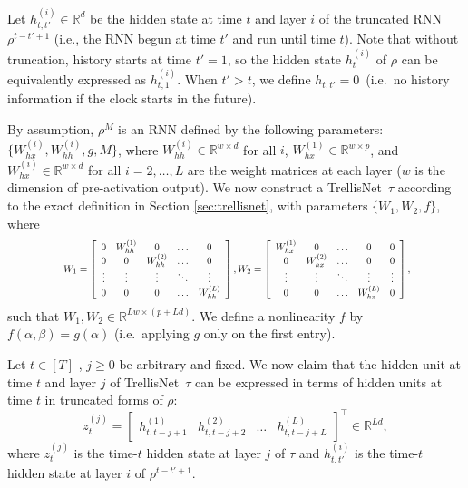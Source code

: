 \documentclass{article} \usepackage{iclr2019_conference,times}
\newcommand{\model}{TrellisNet}
\newenvironment{proofidx}[1]{\renewcommand{\proofname}{Proof of Theorem #1}\proof}{\endproof}
\begin{document}
\vspace{-.1in}
\begin{proofidx}{\ref{thm:trellisnet-rnn}}
Let $h_{t,t'}^{(i)} \in \mathbb{R}^d$ be the hidden state at time $t$ and layer $i$ of the truncated RNN $\rho^{t-t'+1}$ (i.e., the RNN begun at time $t'$ and run until time $t$). Note that without truncation, history starts at time $t'=1$, so the hidden state $h_t^{(i)}$ of $\rho$ can be equivalently expressed as $h_{t,1}^{(i)}$. When $t' > t$, we define \small$h_{t,t'}=0$\normalsize~(i.e.\ no history information if the clock starts in the future).

By assumption, $\rho^M$ is an RNN defined by the following parameters: $\{W_{hx}^{(i)}, W_{hh}^{(i)}, g, M\}$, where $W_{hh}^{(i)} \in \mathbb{R}^{w \times d}$ for all $i$, $W_{hx}^{(1)} \in \mathbb{R}^{w \times p}$, and $W_{hx}^{(i)} \in \mathbb{R}^{w \times d}$ for all $i=2,\dots,L$ are the weight matrices at each layer ($w$ is the dimension of pre-activation output). We now construct a \model~$\tau$ according to the exact definition in Section \ref{sec:trellisnet}, with parameters $\{W_1, W_2, f\}$, where
\begin{equation}
\label{eq:sparse-kernel}
\resizebox{.8\hsize}{!}{
$
W_1 = \left[
\begin{array}{ccccc}
0 & W_{hh}^{(1)} & 0 & \ldots & 0 \\
0 & 0 & W_{hh}^{(2)} & \ldots & 0 \\
\vdots & \vdots & \vdots & \ddots & \vdots \\
0 & 0 & 0 & \ldots & W_{hh}^{(L)}
\end{array}
\right],
W_2 = \left[
\begin{array}{ccccc}
W_{hx}^{(1)} & 0 & \ldots & 0 & 0 \\
0 & W_{hx}^{(2)} & \ldots & 0 & 0 \\
\vdots & \vdots & \ddots & \vdots & \vdots \\
0 & 0 & \ldots & W_{hx}^{(L)} & 0
\end{array}
\right],
$}
\end{equation}
such that $W_1, W_2 \in \mathbb{R}^{Lw \times (p+Ld)}$. We define a nonlinearity $f$ by $f(\alpha, \beta) = g(\alpha)$ (i.e.\ applying $g$ only on the first entry).

Let $t \in [T]$ , $j \geq 0$ be arbitrary and fixed. We now claim that the hidden unit at time $t$ and layer $j$ of \model~$\tau$ can be expressed in terms of hidden units at time $t$ in truncated forms of $\rho$:
\begin{equation}
\label{pf-eq:rnn-tcn-mix}
z_t^{(j)} = \begin{bmatrix}
h_{t,t-j+1}^{(1)} & h_{t,t-j+2}^{(2)} & \dots & h_{t,t-j+L}^{(L)}
\end{bmatrix}^\top \in \mathbb{R}^{Ld},
\end{equation}
where $z_t^{(j)}$ is the time-$t$ hidden state at layer $j$ of $\tau$ and $h_{t,t'}^{(i)}$ is the time-$t$ hidden state at layer $i$ of $\rho^{t-t'+1}$.


\end{proofidx}
\end{document}
